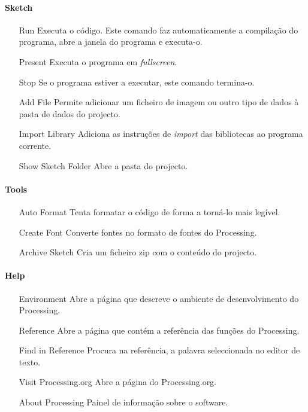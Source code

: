 \paragraph{Sketch}
\begin{itemize}
\item[Run] Executa o código. Este comando faz automaticamente a compilação do programa, abre a janela do programa e executa-o.
\item[Present] Executa o programa em \emph{fullscreen}.
\item[Stop] Se o programa estiver a executar, este comando termina-o.
\item[Add File] Permite adicionar um ficheiro de imagem ou outro tipo de dados à pasta de dados do projecto.
\item[Import Library] Adiciona as instruções de \emph{import} das bibliotecas ao programa corrente.
\item[Show Sketch Folder] Abre a pasta do projecto.
\end{itemize}

\paragraph{Tools}
\begin{itemize}
\item[Auto Format] Tenta formatar o código de forma a torná-lo mais legível.
\item[Create Font] Converte fontes no formato de fontes do Processing.
\item[Archive Sketch] Cria um ficheiro zip com o conteúdo do projecto.
\end{itemize}

\paragraph{Help}
\begin{itemize}
\item[Environment] Abre a página que descreve o ambiente de desenvolvimento do Processing.
\item[Reference] Abre  a página que contém a referência das funções do Processing.
\item[Find in Reference] Procura na referência, a palavra seleccionada no editor de texto.
\item[Visit Processing.org] Abre a página do Processing.org.
\item[About Processing] Painel de informação sobre o software.
\end{itemize}

